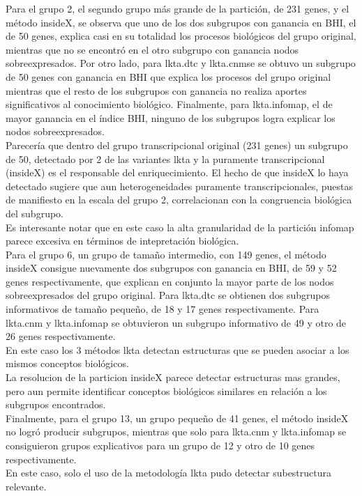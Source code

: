 Para el grupo 2, el segundo grupo más grande de la partición, de 231 genes, y el método insideX, se observa que uno de los dos subgrupos con ganancia en BHI, el de 50 genes, explica casi en su totalidad los procesos biológicos del grupo original, mientras que no se encontró en el otro subgrupo con ganancia nodos sobreexpresados. Por otro lado, para lkta.dtc y lkta.cnmse se obtuvo un subgrupo de 50 genes con ganancia en BHI que explica los procesos del grupo original mientras que el resto de los subgrupos con ganancia no realiza aportes significativos al conocimiento biológico. Finalmente, para lkta.infomap, el de mayor ganancia en el índice BHI, ninguno de los subgrupos logra explicar los nodos sobreexpresados.\\
Parecería que dentro del grupo transcripcional original (231 genes) un subgrupo de 50, detectado por 2 de las variantes lkta y la puramente transcripcional (insideX) es el responsable del enriquecimiento. El hecho de que insideX lo haya detectado sugiere que aun heterogeneidades puramente transcripcionales, puestas de manifiesto en la escala del grupo 2, correlacionan con la congruencia biológica del subgrupo.\\
Es interesante notar que en este caso la alta granularidad de la partición infomap parece excesiva en términos de intepretación biológica.\\
Para el grupo 6, un grupo de tamaño intermedio, con 149 genes, el método insideX consigue nuevamente dos subgrupos con ganancia en BHI, de 59 y 52 genes respectivamente, que explican en conjunto la mayor parte de los nodos sobreexpresados del grupo original. Para lkta.dtc se obtienen dos subgrupos informativos de tamaño pequeño, de 18 y 17 genes respectivamente. Para lkta.cnm y lkta.infomap se obtuvieron un subgrupo informativo de 49 y otro de 26 genes respectivamente.\\
En este caso los 3 métodos lkta detectan estructuras que se pueden asociar a los mismos conceptos biológicos.\\
La resolucion de la particion insideX parece detectar estructuras mas grandes, pero aun permite identificar conceptos biológicos similares en relación a los subgrupos encontrados.\\
Finalmente, para el grupo 13, un grupo pequeño de 41 genes, el método insideX no logró producir subgrupos, mientras que solo para lkta.cnm y lkta.infomap se consiguieron grupos explicativos para un grupo de 12 y otro de 10 genes respectivamente.\\
En este caso, solo el uso de la metodología lkta pudo detectar subestructura relevante.\\
